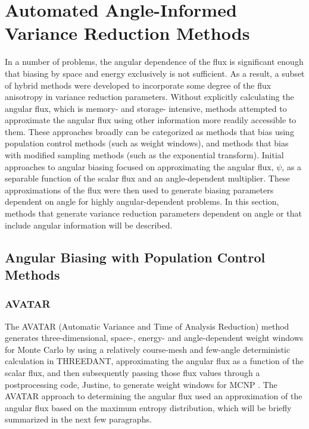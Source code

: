 \section{Automated Angle-Informed Variance Reduction Methods}
\label{sec:AngleVR}

In a number of problems, the angular dependence of the flux is significant enough that
biasing by space and energy exclusively is not
sufficient. As a result, a subset of hybrid methods were developed to incorporate some
degree of the flux anisotropy in variance reduction parameters. Without explicitly
calculating the angular flux, which is memory- and storage- intensive, methods
attempted to approximate the angular flux using other information more readily
accessible to them. These approaches broadly can be categorized as methods that
bias using population control methods (such as weight windows),
and methods that bias with modified
sampling methods (such as the exponential transform).
Initial approaches
to angular biasing focused on approximating the angular flux, $\psi$,
as a separable
function of the scalar flux and an angle-dependent multiplier.
These approximations of the flux were then used to generate biasing
parameters dependent on angle for highly angular-dependent problems. In this
section, methods that generate variance reduction parameters dependent on angle
or that include angular information will be described.

\subsection{Angular Biasing with Population Control Methods}

\subsubsection{AVATAR}
\label{subsec:AVATAR}

The AVATAR \cite{van_riper_generation_1995, van_riper_avatarautomatic_1997}
(Automatic Variance and Time of Analysis Reduction) method generates
three-dimensional, space-, energy- and angle-dependent weight windows for Monte
Carlo by
using a relatively course-mesh and few-angle deterministic calculation in
THREEDANT, approximating the angular flux as a function of the scalar flux, and
then subsequently passing those flux values through a postprocessing
code, Justine, to generate
weight windows for MCNP \cite{mcnp_manual_v1}. The AVATAR approach to
determining the angular flux used an approximation of the angular flux based on
the maximum entropy distribution, which will be briefly summarized in the next
few paragraphs.


